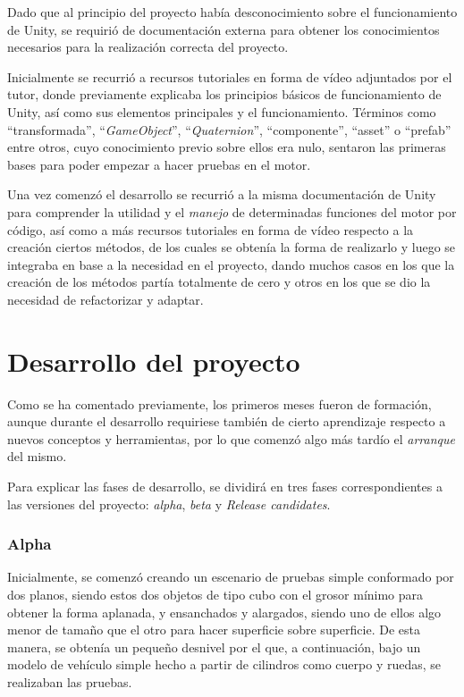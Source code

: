 Dado que al principio del proyecto había desconocimiento sobre el funcionamiento de Unity, se requirió de documentación externa para obtener los conocimientos necesarios para la realización correcta del proyecto.

Inicialmente se recurrió a recursos tutoriales en forma de vídeo adjuntados por el tutor, donde previamente explicaba los principios básicos de funcionamiento de Unity, así como sus elementos principales y el funcionamiento. Términos como ``transformada'', ``\textit{GameObject}'', ``\textit{Quaternion}'', ``componente'', ``asset'' o ``prefab'' entre otros, cuyo conocimiento previo sobre ellos era nulo, sentaron las primeras bases para poder empezar a hacer pruebas en el motor.

Una vez comenzó el desarrollo se recurrió a la misma documentación de Unity para comprender la utilidad y el \textit{manejo} de determinadas funciones del motor por código, así como a más recursos tutoriales en forma de vídeo respecto a la creación ciertos métodos, de los cuales se obtenía la forma de realizarlo y luego se integraba en base a la necesidad en el proyecto, dando muchos casos en los que la creación de los métodos partía totalmente de cero y otros en los que se dio la necesidad de refactorizar y adaptar.

\section{Desarrollo del proyecto}

Como se ha comentado previamente, los primeros meses fueron de formación, aunque durante el desarrollo requiriese también de cierto aprendizaje respecto a nuevos conceptos y herramientas, por lo que comenzó algo más tardío el \textit{arranque} del mismo.

Para explicar las fases de desarrollo, se dividirá en tres fases correspondientes a las versiones del proyecto: \textit{alpha}, \textit{beta} y \textit{Release candidates}.

\subsubsection{Alpha}

Inicialmente, se comenzó creando un escenario de pruebas simple conformado por dos planos, siendo estos dos objetos de tipo cubo con el grosor mínimo para obtener la forma aplanada, y ensanchados y alargados, siendo uno de ellos algo menor de tamaño que el otro para hacer superficie sobre superficie. De esta manera, se obtenía un pequeño desnivel por el que, a continuación, bajo un modelo de vehículo simple hecho a partir de cilindros como cuerpo y ruedas, se realizaban las pruebas.

